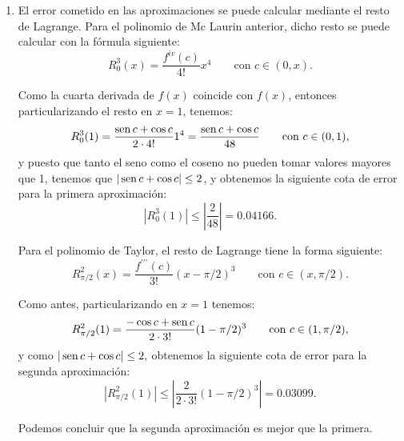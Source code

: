 {\begin{enumerate}
y, de nuevo, tomando $x=1$, la aproximación que da este polinomio para $f(1)=\frac{\sen 1+\cos 1}2$ es: 
\[
P_{\pi/2}^2(1)=\frac 12-\frac{1}{2}(1-\pi/2)-\frac{1}{4}(1-\pi/2)^2 = 0.70395. 
\]

\item  El error cometido en las aproximaciones se puede calcular mediante el resto de Lagrange. Para el polinomio de Mc Laurin anterior, dicho resto se puede calcular con la fórmula siguiente: 
\[
R_0^3(x) = \frac{f^{iv}(c)}{4!}x^4\qquad \mbox{con }c\in (0,x). 
\]

Como la cuarta derivada de $f(x)$ coincide con $f(x)$, entonces particularizando el resto en $x=1$, tenemos: 
\[
R_0^3(1)=\frac{\operatorname{sen} c+\cos c}{2\cdot 4!}1^4 = \frac{\operatorname{sen} c+\cos c}{48} \qquad \text{con }c\in (0,1), 
\]
y puesto que tanto el seno como el coseno no pueden tomar valores mayores que 1, tenemos que $|\operatorname{sen} c+\cos c|\leq 2$, y obtenemos la siguiente cota de error para la primera aproximaci\'{o}n: 
\[
|R_0^3(1)|\leq |\frac{2}{48}|=0.04166. 
\]

Para el polinomio de Taylor, el resto de Lagrange tiene la forma siguiente: 
\[
R_{\pi/2}^2(x)=\frac{f^{\prime \prime \prime }(c)}{3!}(x-\pi/2)^3\qquad \mbox{con }c\in (x,\pi /2). 
\]

Como antes, particularizando en $x=1$ tenemos: 
\[
R_{\pi/2}^2(1)=\frac{-\cos c+\operatorname{sen} c}{2\cdot 3!}(1-\pi/2)^3 \qquad \mbox{con }c\in (1,\pi /2), 
\]
y como $|\operatorname{sen} c+\cos c|\leq 2,$ obtenemos la siguiente cota de error para la segunda aproximación: 
\[
|R_{\pi/2}^2(1)|\leq |\frac{2}{2\cdot 3!}(1-\pi/2)^3|=0.03099. 
\]

Podemos concluir que la segunda aproximación es mejor que la primera.
\end{enumerate}
}



